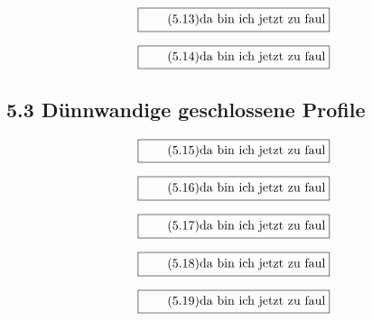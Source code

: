 \documentclass[11pt]{article}
\newcommand{\1}{ {\mathds{1}} }
\begin{document}
    \begin{equation}
      \boxed{
        \tag{5.13}
        \begin{split}
          \text{da bin ich jetzt zu faul}
        \end{split}
      }
    \end{equation}

    \begin{equation}
      \boxed{
        \tag{5.14}
        \begin{split}
          \text{da bin ich jetzt zu faul}
        \end{split}
      }
    \end{equation}

    \subsection*{5.3 Dünnwandige geschlossene Profile}

    \begin{equation}
      \boxed{
        \tag{5.15}
        \begin{split}
          \text{da bin ich jetzt zu faul}
        \end{split}
      }
    \end{equation}

    \begin{equation}
      \boxed{
        \tag{5.16}
        \begin{split}
          \text{da bin ich jetzt zu faul}
        \end{split}
      }
    \end{equation}

    \begin{equation}
      \boxed{
        \tag{5.17}
        \begin{split}
          \text{da bin ich jetzt zu faul}
        \end{split}
      }
    \end{equation}

    \begin{equation}
      \boxed{
        \tag{5.18}
        \begin{split}
          \text{da bin ich jetzt zu faul}
        \end{split}
      }
    \end{equation}

    \begin{equation}
      \boxed{
        \tag{5.19}
        \begin{split}
          \text{da bin ich jetzt zu faul}
        \end{split}
      }
    \end{equation}
\end{document}

